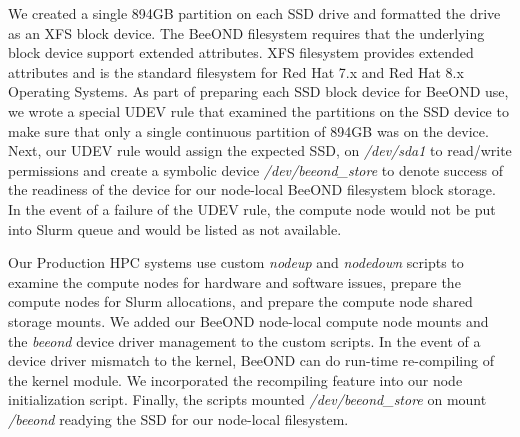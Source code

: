 
We created a single 894GB partition on each SSD drive and formatted the drive as an XFS block device.  The BeeOND filesystem requires that the underlying block device support extended attributes. XFS filesystem provides extended attributes and is the standard filesystem for Red Hat 7.x and Red Hat 8.x Operating Systems.  As part of preparing each SSD block device for BeeOND use, we wrote a special UDEV rule that examined the partitions on the SSD device to make sure that only a single continuous partition of 894GB was on the device.  Next, our UDEV rule would assign the expected SSD, on \textit{/dev/sda1} to read/write permissions and create a symbolic device \textit{/dev/beeond\_store} to denote success of the readiness of the device for our node-local BeeOND filesystem block storage.  In the event of a failure of the UDEV rule, the compute node would not be put into Slurm queue and would be listed as not available.  

Our Production HPC systems use custom \textit{nodeup} and \textit{nodedown} scripts to examine the compute nodes for hardware and software issues, prepare the compute nodes for Slurm allocations, and prepare the compute node shared storage mounts.  We added our BeeOND node-local compute node mounts and the \textit{beeond} device driver management to the custom scripts.  In the event of a device driver mismatch to the kernel, BeeOND can do run-time re-compiling of the kernel module.  We incorporated the recompiling feature into our node initialization script.  Finally, the scripts mounted \textit{/dev/beeond\_store} on mount \textit{/beeond} readying the SSD for our node-local filesystem.

